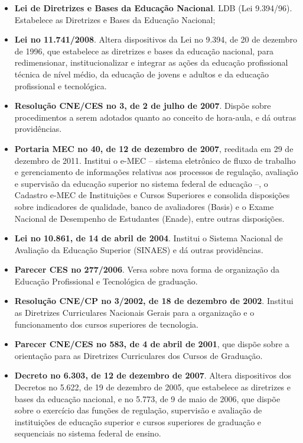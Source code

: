 \begin{itemize}
\item \textbf{Lei de Diretrizes e Bases da Educação Nacional}. LDB (Lei 9.394/96). Estabelece as Diretrizes e Bases da Educação Nacional;

\item \textbf{Lei no 11.741/2008}. Altera dispositivos da Lei no 9.394, de 20 de dezembro de 1996, que estabelece as diretrizes e bases da educação nacional, para redimensionar, institucionalizar e integrar as ações da educação profissional técnica de nível médio, da educação de jovens e adultos e da educação profissional e tecnológica.

\item \textbf{Resolução CNE/CES no 3, de 2 de julho de 2007}. Dispõe sobre procedimentos a serem adotados quanto ao conceito de hora-aula, e dá outras providências.

\item \textbf{Portaria MEC no 40, de 12 de dezembro de 2007}, reeditada em 29 de dezembro de 2011. Institui o e-MEC – sistema eletrônico de fluxo de trabalho e gerenciamento de informações relativas aos processos de regulação, avaliação e supervisão da educação superior no sistema federal de educação –, o Cadastro e-MEC de Instituições e Cursos Superiores e consolida disposições sobre indicadores de qualidade, banco de avaliadores (Basis) e o Exame Nacional de Desempenho de Estudantes (Enade), entre outras disposições.

\item \textbf{Lei no 10.861, de 14 de abril de 2004}. Institui o Sistema Nacional de Avaliação da Educação Superior (SINAES) e dá outras providências.

\item \textbf{Parecer CES no 277/2006}. Versa sobre nova forma de organização da Educação Profissional e Tecnológica de graduação.

\item \textbf{Resolução CNE/CP no 3/2002, de 18 de dezembro de 2002}. Institui as Diretrizes Curriculares Nacionais Gerais para a organização e o funcionamento dos cursos superiores de tecnologia.

\item \textbf{Parecer CNE/CES no 583, de 4 de abril de 2001}, que dispõe sobre a orientação para as Diretrizes Curriculares dos Cursos de Graduação.

\item \textbf{Decreto no 6.303, de 12 de dezembro de 2007}. Altera dispositivos dos Decretos no 5.622, de 19 de dezembro de 2005, que estabelece as diretrizes e bases da educação nacional, e no 5.773, de 9 de maio de 2006, que dispõe sobre o exercício das funções de regulação, supervisão e avaliação de instituições de educação superior e cursos superiores de graduação e sequenciais no sistema federal de ensino.


\end{itemize}
